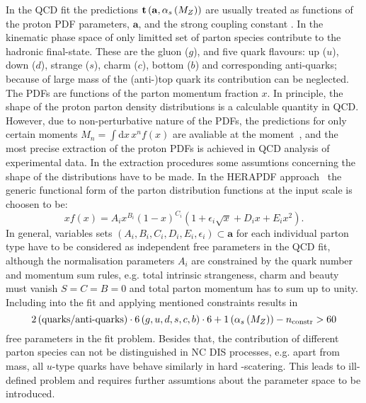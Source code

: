 In the QCD fit the predictions $\mathbf{t}\left( \mathbf{a},\mbox{$\alpha_{s}\left(M_{Z}\right)$}\right)$ are usually treated as functions of the proton PDF parameters, $\mathbf{a}$, and the strong coupling constant \asz. In the kinematic phase space of \hera only limitted set of parton species contribute to the hadronic final-state. These are the gluon ($g$), and five quark flavours: up ($u$), down ($d$), strange ($s$), charm ($c$), bottom ($b$) and corresponding anti-quarks; because of large mass of the (anti-)top quark its contribution can be neglected. The PDFs are functions of the parton momentum fraction $x$. In principle, the shape of the proton parton density distributions is a calculable quantity in QCD. However, due to non-perturbative nature of the PDFs, the predictions for only certain moments $M_n=\int\mathrm{d}x\,x^n f\left(x\right)$ are avaliable at the moment~\cite{Hagler:2009ni}, and the most precise extraction of the proton PDFs is achieved in QCD analysis of experimental data. In the extraction procedures some assumtions concerning the shape of the distributions have to be made. In the HERAPDF approach~\cite{Aaron:2009aa} the generic functional form of the parton distribution functions at the input scale is choosen to be:
\begin{equation}
 xf\left(x\right) = A_ix^{B_i}\left(1-x\right)^{C_i}\left(1+\epsilon_i\sqrt{x}+D_ix+E_ix^2\right).
\end{equation}
In general, variables sets $\left(A_i,B_i,C_i,D_i,E_i,\epsilon_i\right)\subset\mathbf{a}$ for each individual parton type have to be considered as independent free parameters in the QCD fit, although the normalisation parameters $A_i$ are constrained by the quark number and momentum sum rules, e.g. total intrinsic strangeness, charm and beauty must vanish $S=C=B=0$ and total parton momentum has to sum up to unity. Including \asz into the fit and applying mentioned constraints results in 
\begin{equation}
2 \left( \text{quarks/anti-quarks}\right)\cdot 6\left(g,u,d,s,c,b\right)\cdot 6 + 1\left(\mbox{$\alpha_{s}\left(M_{Z}\right)$}\right) - n_\text{constr} > 60
\end{equation}
free parameters in the fit problem. Besides that, the contribution of different parton species can not be distinguished in NC DIS processes, e.g. apart from mass, all $u$-type quarks have behave similarly in hard \ep-scatering. 
This leads to ill-defined problem and requires further assumtions about the parameter space to be introduced. 

